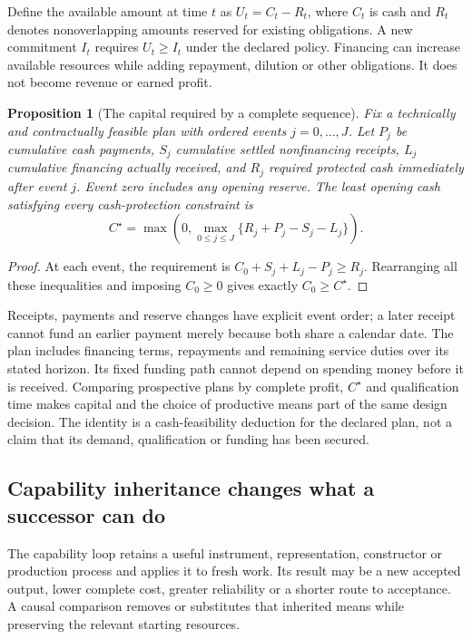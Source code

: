 \documentclass[11pt,letterpaper]{article}
\newtheorem{proposition}{Proposition}\newtheorem{definition}{Definition}
\begin{document}
Define the available amount at time $t$ as $U_t=C_t-R_t$, where $C_t$ is cash and $R_t$ denotes nonoverlapping amounts reserved for existing obligations. A new commitment $I_t$ requires $U_t\ge I_t$ under the declared policy. Financing can increase available resources while adding repayment, dilution or other obligations. It does not become revenue or earned profit.

\begin{proposition}[The capital required by a complete sequence]
\label{prop:capital}
Fix a technically and contractually feasible plan with ordered events $j=0,\ldots,J$. Let $P_j$ be cumulative cash payments, $S_j$ cumulative settled nonfinancing receipts, $L_j$ cumulative financing actually received, and $R_j$ required protected cash immediately after event $j$. Event zero includes any opening reserve. The least opening cash satisfying every cash-protection constraint is
\begin{equation}
C^\star=\max\!\left(0,\max_{0\le j\le J}\{R_j+P_j-S_j-L_j\}\right).
\label{eq:capital}
\end{equation}
\end{proposition}
\begin{proof}
At each event, the requirement is $C_0+S_j+L_j-P_j\ge R_j$. Rearranging all these inequalities and imposing $C_0\ge0$ gives exactly $C_0\ge C^\star$.
\end{proof}
Receipts, payments and reserve changes have explicit event order; a later receipt cannot fund an earlier payment merely because both share a calendar date. The plan includes financing terms, repayments and remaining service duties over its stated horizon. Its fixed funding path cannot depend on spending money before it is received. Comparing prospective plans by complete profit, $C^\star$ and qualification time makes capital and the choice of productive means part of the same design decision. The identity is a cash-feasibility deduction for the declared plan, not a claim that its demand, qualification or funding has been secured.

\subsection{Capability inheritance changes what a successor can do}
The capability loop retains a useful instrument, representation, constructor or production process and applies it to fresh work. Its result may be a new accepted output, lower complete cost, greater reliability or a shorter route to acceptance. A causal comparison removes or substitutes that inherited means while preserving the relevant starting resources.
\end{document}
